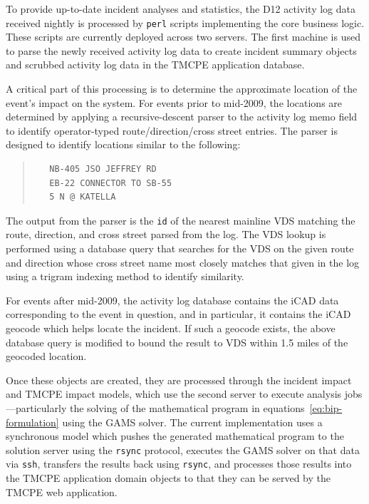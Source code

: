 \documentclass[12pt]{report}
\begin{document}
To provide up-to-date incident analyses and statistics, the \ac{D12} activity
log data received nightly is processed by \texttt{perl} scripts implementing the
core business logic.  These scripts are currently deployed across two servers.
The first machine is used to parse the newly received activity log data to
create incident summary objects and scrubbed activity log data in the \ac{TMCPE}
application database.

A critical part of this processing is to determine the approximate location of
the event's impact on the system.  For events prior to mid-2009, the locations
are determined by applying a recursive-descent parser to the activity log memo
field to identify operator-typed route/direction/cross street entries.  The
parser is designed to identify locations similar to the following:
\begin{quote}
\begin{verbatim}
   NB-405 JSO JEFFREY RD
   EB-22 CONNECTOR TO SB-55
   5 N @ KATELLA
\end{verbatim}
\end{quote}
The output from the parser is the \texttt{id} of the nearest mainline \ac{VDS}
matching the route, direction, and cross street parsed from the log.  The
\ac{VDS} lookup is performed using a database query that searches for the
\ac{VDS} on the given route and direction whose cross street name most closely
matches that given in the log using a trigram indexing method to identify
similarity.

For events after mid-2009, the activity log database contains the \ac{iCAD} data
corresponding to the event in question, and in particular, it contains the
\ac{iCAD} geocode which helps locate the incident.  If such a geocode exists,
the above database query is modified to bound the result to \ac{VDS} within 1.5
miles of the geocoded location.

Once these objects are created, they are processed through the incident impact
and \ac{TMCPE} impact models, which use the second server to execute analysis
jobs---particularly the solving of the mathematical program in
equations~\eqref{eq:bip-formulation} using the \ac{GAMS} solver.  The current
implementation uses a synchronous model which pushes the generated mathematical
program to the solution server using the \texttt{rsync} protocol, executes the
\ac{GAMS} solver on that data via \texttt{ssh}, transfers the results back using
\texttt{rsync}, and processes those results into the \ac{TMCPE} application
domain objects to that they can be served by the \ac{TMCPE} web application.
\end{document}
